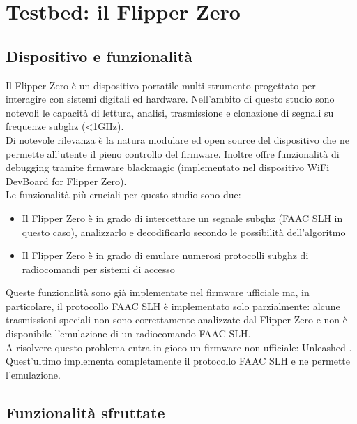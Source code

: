 \chapter{Testbed: il Flipper Zero}
\label{cha:testbed}

\section{Dispositivo e funzionalità}
\label{sec:device}

Il Flipper Zero è un dispositivo portatile multi-strumento progettato per interagire con sistemi digitali ed hardware. Nell'ambito di questo studio sono notevoli le capacità di lettura, analisi, trasmissione e clonazione di segnali su frequenze subghz (\textless1GHz).\\
Di notevole rilevanza è la natura modulare ed open source del dispositivo che ne permette all'utente il pieno controllo del firmware. Inoltre offre funzionalità di debugging tramite firmware blackmagic (implementato nel dispositivo WiFi DevBoard for Flipper Zero).\\
Le funzionalità più cruciali per questo studio sono due:
\begin{itemize}
  \item Il Flipper Zero è in grado di intercettare un segnale subghz (FAAC SLH in questo caso), analizzarlo e decodificarlo secondo le possibilità dell'algoritmo
  \item Il Flipper Zero è in grado di emulare numerosi protocolli subghz di radiocomandi per sistemi di accesso
\end{itemize}
Queste funzionalità sono già implementate nel firmware ufficiale \cite{off_firmware} ma, in particolare, il protocollo FAAC SLH è implementato solo parzialmente: alcune trasmissioni speciali non sono correttamente analizzate dal Flipper Zero e non è disponibile l'emulazione di un radiocomando FAAC SLH.\\
A risolvere questo problema entra in gioco un firmware non ufficiale: Unleashed \cite{firmware}. Quest'ultimo implementa completamente il protocollo FAAC SLH e ne permette l'emulazione.\\

\section{Funzionalità sfruttate}
\label{sec:flip_func}

